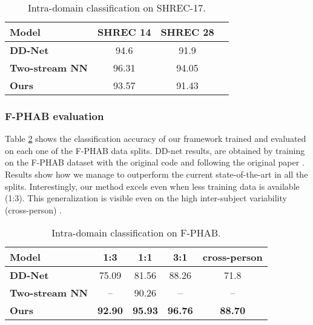 \documentclass[letterpaper, 10 pt, conference]{ieeeconf}
\begin{document}
\begin{table}[!hb]
\centering
\begin{tabular}{|l|c|c|c|}
\hline
\textbf{Model} & \textbf{SHREC 14} & \textbf{SHREC 28} \\ \hline
\textbf{DD-Net \cite{yang2019make}} & 94.6 & 91.9 \\ \hline
\textbf{Two-stream NN \cite{li2021two}} & 96.31 & 94.05 \\ \hline
\textbf{Ours} & 93.57 & 91.43 \\ \hline
\end{tabular}
\caption{Intra-domain classification on SHREC-17.}
\label{tab:shrec_bench}
\end{table}


\subsubsection{F-PHAB evaluation}

Table \ref{tab:fphab_bench} shows the classification accuracy of our framework trained and evaluated on each one of the F-PHAB data splits.
DD-net results, are obtained by training on the F-PHAB dataset with the original code and following the original paper \cite{yang2019make}.
Results show how we manage to outperform the current state-of-the-art in all the splits.
Interestingly, our method excels even when less training data is available (1:3). 
This generalization is visible even on the high inter-subject variability (cross-person) \cite{garcia2018first}.



\begin{table}[!htb]
\centering
\begin{tabular}{|l|c|c|c|c|}
\hline
\textbf{Model} & \textbf{1:3} & \textbf{1:1} & \textbf{3:1} & \textbf{cross-person} \\ \hline
\textbf{DD-Net \cite{yang2019make}} & 75.09 & 81.56 & 88.26 & 71.8 \\ \hline \textbf{Two-stream NN \cite{li2021two}} & -- & 90.26 & -- & -- \\ \hline \textbf{Ours} & \textbf{92.90} & \textbf{95.93} & \textbf{96.76} & \textbf{88.70} \\ \hline
\end{tabular}
\caption{Intra-domain classification on F-PHAB.}
\label{tab:fphab_bench}
\end{table}
\end{document}

